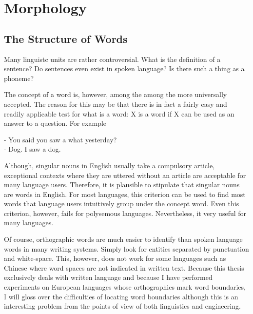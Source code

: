 \chapter{Morphology}

\section{The Structure of Words}

Many linguistc units are rather controversial. What is the definition
of a sentence? Do sentences even exist in spoken language? Is there
such a thing as a phoneme?

The concept of a word is, however, among the among the more
universally accepted. The reason for this may be that there is in fact
a fairly easy and readily applicable test for what is a word: X is a
word if X can be used as an answer to a question. For example
\begin{displayquote}
- You said you saw a what yesterday? \\
- Dog. I saw a dog.  
\end{displayquote}
Although, singular nouns in English usually take a compulsory article,
exceptional contexts where they are uttered without an article are
acceptable for many language users. Therefore, it is plausible to
stipulate that singular nouns are words in English. For most
languages, this criterion can be used to find most words that language
users intuitively group under the concept word. Even this criterion,
however, fails for polysemous languages. Nevertheless, it very useful
for many languages.

Of course, orthographic words are much easier to identify than spoken
language words in many writing systems. Simply look for entities
separated by punctuation and white-space. This, however, does not work
for some languages such as Chinese where word spaces are not indicated
in written text. Because this thesis exclusively deals with written
language and because I have performed experiments on European
languages whose orthographies mark word boundaries, I will gloss over
the difficulties of locating word boundaries although this is an
interesting problem from the points of view of both linguistics and
engineering.

